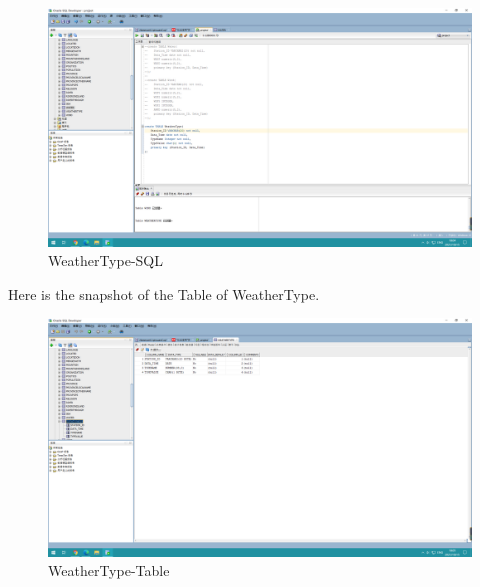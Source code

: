 \documentclass[]{article}
\begin{document}
	\begin{figure}[H]
		\centering
		\includegraphics[width=1\linewidth]{../d3-p/weatherType-sql}
		\caption{WeatherType-SQL}
		\label{fig:weathertype-sql}
	\end{figure}

	\noindent Here is the snapshot of the Table of WeatherType. \\

	\begin{figure}[H]
		\centering
		\includegraphics[width=1\linewidth]{../d3-p/weatherType}
		\caption{WeatherType-Table}
		\label{fig:weathertype}
	\end{figure}
	
	
\end{document}
